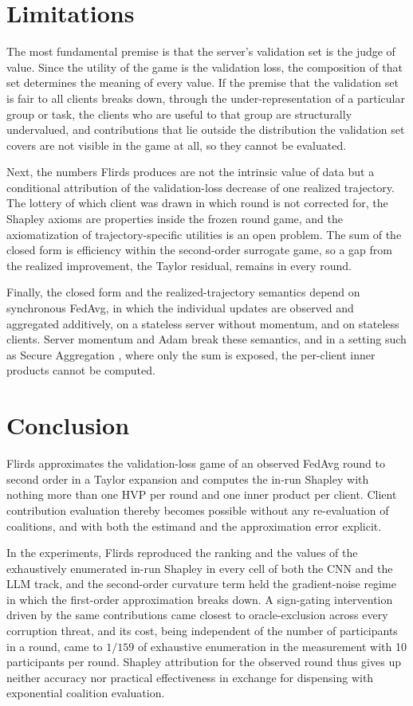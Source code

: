 \documentclass[letterpaper]{article} %
\theoremstyle{definition} %
\begin{document}
\section{Limitations}
\label{sec:limitations}

The most fundamental premise is that the server's validation set is the judge
of value. Since the utility of the game is the validation loss, the
composition of that set determines the meaning of every value. If the premise
that the validation set is fair to all clients breaks down, through the
under-representation of a particular group or task, the clients who are
useful to that group are structurally undervalued, and contributions that lie
outside the distribution the validation set covers are not visible in the
game at all, so they cannot be evaluated.

Next, the numbers Flirds produces are not the intrinsic value of data but a
conditional attribution of the validation-loss decrease of one realized
trajectory. The lottery of which client was drawn in which round is not
corrected for, the Shapley axioms are properties inside the frozen round
game, and the axiomatization of trajectory-specific utilities is an open
problem. The sum of the closed form is efficiency within the second-order
surrogate game, so a gap from the realized improvement, the Taylor residual,
remains in every round.

Finally, the closed form and the realized-trajectory semantics depend on
synchronous FedAvg, in which the individual updates are observed and
aggregated additively, on a stateless server without momentum, and on
stateless clients. Server momentum and Adam break these semantics, and in a
setting such as Secure Aggregation \citep{bonawitz2017practical}, where only
the sum is exposed, the per-client inner products cannot be computed.

\section{Conclusion}
\label{sec:conclusion}

Flirds approximates the validation-loss game of an observed FedAvg round to
second order in a Taylor expansion and computes the in-run Shapley with
nothing more than one HVP per round and one inner product per client. Client
contribution evaluation thereby becomes possible without any re-evaluation of
coalitions, and with both the estimand and the approximation error explicit.

In the experiments, Flirds reproduced the ranking and the values of the
exhaustively enumerated in-run Shapley in every cell of both the CNN and the
LLM track, and the second-order curvature term held the gradient-noise regime
in which the first-order approximation breaks down. A sign-gating
intervention driven by the same contributions came closest to
oracle-exclusion across every corruption threat, and its cost, being
independent of the number of participants in a round, came to $1/159$ of
exhaustive enumeration in the measurement with 10 participants per round.
Shapley attribution for the observed round thus gives up neither accuracy nor
practical effectiveness in exchange for dispensing with exponential coalition
evaluation.
\end{document}
